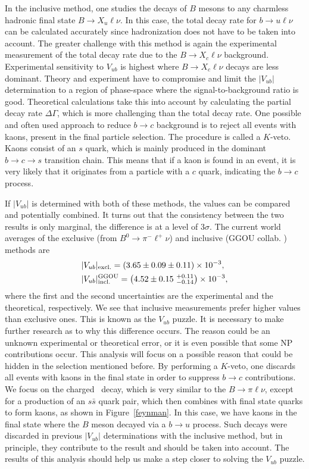 In the inclusive method, one studies the decays of $B$ mesons to any charmless hadronic final state $B \to X_u \ell \nu$. In this case, the total decay rate for $b \to u \ell \nu$ can be calculated accurately since hadronization does not have to be taken into account. The greater challenge with this method is again the experimental measurement of the total decay rate due to the $B \to X_c \ell \nu$ background. Experimental sensitivity to $V_{ub}$ is highest where $B \to X_c \ell \nu$ decays are less dominant. Theory and experiment have to compromise and limit the $\vert V_{ub}\vert $ determination to a region of phase-space where the signal-to-background ratio is good. Theoretical calculations take this into account by calculating the partial decay rate $\Delta \Gamma$, which is more challenging than the total decay rate. One possible and often used approach to reduce $b \to c$ background is to reject all events with kaons, present in the final particle selection. The procedure is called a $K$-veto. Kaons consist of an $s$ quark, which is mainly produced in the dominant $b \to c \to s$ transition chain. This means that if a kaon is found in an event, it is very likely that it originates from a particle with a $c$ quark, indicating the $b \to c$ process. 

If $\vert V_{ub} \vert$ is determined with both of these methods, the values can be compared and potentially combined. It turns out that the consistency between the two results is only marginal, the difference is at a level of $3\sigma$. The current world averages \cite{Amhis:2016xyh} of the exclusive (from $B^0 \to \pi^- \ell^+ \nu$) and inclusive (GGOU collab. \cite{Gambino:2007rp}) methods are
\begin{align}
&\vert V_{ub} \vert_{\mathrm{excl.}} = \left(3.65 \pm 0.09 \pm 0.11\right)\times 10^{-3},\\
&\vert V_{ub} \vert_{\mathrm{incl.}}^{\mathrm{GGOU}} = \left(4.52 \pm 0.15~{}^{+0.11}_{-0.14}\right)\times 10^{-3},
\end{align}
where the first and the second uncertainties are the experimental and the theoretical, respectively. We see that inclusive measurements prefer higher values than exclusive ones. This is known as the $V_{ub}$ puzzle. It is necessary to make further research as to why this difference occurs. The reason could be an unknown experimental or theoretical error, or it is even possible that some NP contributions occur. This analysis will focus on a possible reason that could be hidden in the selection mentioned before. By performing a $K$-veto, one discards all events with kaons in the final state in order to suppress $b \to c$ contributions. We focus on the charged \decaya~decay, which is very similar to the $B \to \pi \ell \nu$, except for a production of an $s \bar s$ quark pair, which then combines with final state quarks to form kaons, as shown in Figure~\ref{feynman}. In this case, we have kaons in the final state where the $B$ meson decayed via a $b \to u$ process. Such decays were discarded in previous $\vert V_{ub} \vert$ determinations with the inclusive method, but in principle, they contribute to the result and should be taken into account. The results of this analysis should help us make a step closer to solving the $V_{ub}$ puzzle. 


